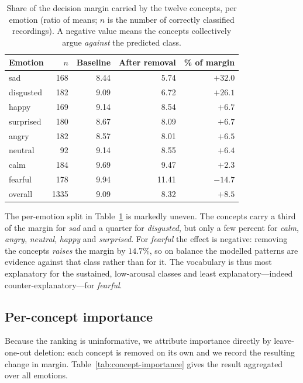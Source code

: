 \begin{table}[t]
\centering
\caption{Share of the decision margin carried by the twelve concepts, per
emotion (ratio of means; $n$ is the number of correctly classified recordings).
A negative value means the concepts collectively argue \emph{against} the
predicted class.}
\label{tab:percent-emotion}
\begin{tabular}{lrrrr}
\toprule
Emotion & $n$ & Baseline & After removal & \% of margin \\
\midrule
sad       & 168 & 8.44 & 5.74 & $+32.0$ \\
disgusted & 182 & 9.09 & 6.72 & $+26.1$ \\
happy     & 169 & 9.14 & 8.54 & $+6.7$ \\
surprised & 180 & 8.67 & 8.09 & $+6.7$ \\
angry     & 182 & 8.57 & 8.01 & $+6.5$ \\
neutral   &  92 & 9.14 & 8.55 & $+6.4$ \\
calm      & 184 & 9.69 & 9.47 & $+2.3$ \\
fearful   & 178 & 9.94 & 11.41 & $-14.7$ \\
\midrule
overall   & 1335 & 9.09 & 8.32 & $+8.5$ \\
\bottomrule
\end{tabular}
\end{table}

The per-emotion split in Table~\ref{tab:percent-emotion} is markedly uneven. The
concepts carry a third of the margin for \emph{sad} and a quarter for
\emph{disgusted}, but only a few percent for \emph{calm}, \emph{angry},
\emph{neutral}, \emph{happy} and \emph{surprised}. For \emph{fearful} the effect
is negative: removing the concepts \emph{raises} the margin by $14.7\%$, so on
balance the modelled patterns are evidence against that class rather than for
it. The vocabulary is thus most explanatory for the sustained, low-arousal
classes and least explanatory---indeed counter-explanatory---for \emph{fearful}.

\subsection{Per-concept importance}
\label{sec:ablation-per-concept}

Because the ranking is uninformative, we attribute importance directly by
leave-one-out deletion: each concept is removed on its own and we record the
resulting change in margin. Table~\ref{tab:concept-importance} gives the result
aggregated over all emotions.

